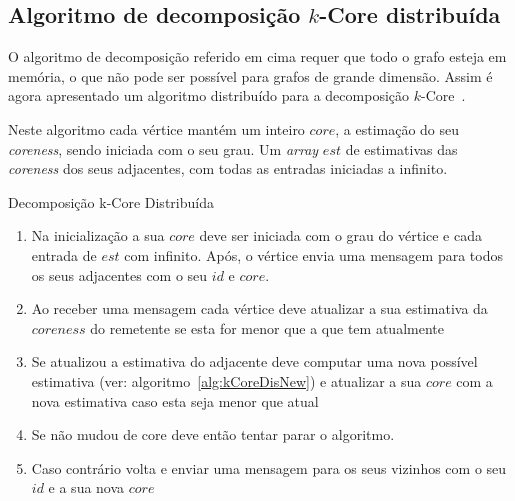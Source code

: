 \newpage
\subsection{Algoritmo de decomposição \texorpdfstring{$k$}{k}-Core distribuída}
O algoritmo de decomposição referido em cima requer que todo o grafo esteja em memória, o que não pode ser possível para grafos de grande dimensão. Assim é agora apresentado um algoritmo distribuído para a decomposição $k$-Core~\cite{kCoreDis}.


Neste algoritmo cada vértice mantém um inteiro $core$, a estimação do seu \textit{coreness}, sendo iniciada com o seu grau. Um \textit{array} $est$ de estimativas das \textit{coreness} dos seus adjacentes, com todas as entradas iniciadas a infinito. %

\begin{algorithm}
\caption{Decomposição k-Core Distribuída}

\begin{enumerate}
	\item Na inicialização a sua $core$ deve ser iniciada com o grau do vértice e cada entrada de $est$ com infinito. Após, o vértice envia uma mensagem para todos os seus adjacentes com o seu $id$ e $core$.
	\item Ao receber uma mensagem cada vértice deve atualizar a sua estimativa da $coreness$ do remetente se esta for menor que a que tem atualmente
	\item Se atualizou a estimativa do adjacente deve computar uma nova possível estimativa (ver: algoritmo~\ref{alg:kCoreDisNew}) e atualizar a sua $core$ com a nova estimativa caso esta seja menor que atual
	\item Se não mudou de core deve então tentar parar o algoritmo.
	\item Caso contrário volta e enviar uma mensagem para os seus vizinhos com o seu $id$ e a sua nova $core$
\end{enumerate}
\end{algorithm}

